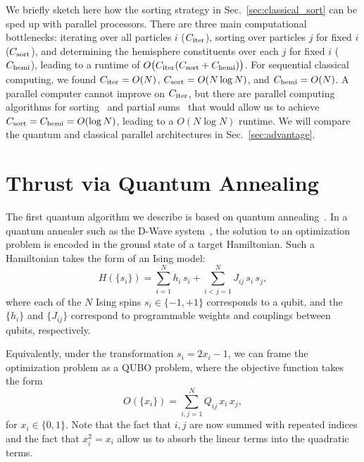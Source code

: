 \documentclass[aps,prd,twocolumn,superscriptaddress,preprintnumbers,nofootinbib,longbibliography,floatfix]{revtex4-1}
\DeclareRobustCommand{\Sec}[1]{Sec.~\ref{#1}}
\begin{document}
We briefly sketch here how  the sorting strategy in \Sec{sec:classical_sort} can be
sped up with parallel processors.
%
There are three main computational bottlenecks:  iterating over all particles $i$ ($C_{\rm iter}$), sorting over particles $j$ for fixed $i$ ($C_{\rm sort}$), and determining the hemisphere constituents over each $j$ for fixed $i$ ($C_{\rm hemi}$), leading to a runtime of $O\big(C_{\rm iter} (C_{\rm sort} + C_{\rm hemi}) \big)$.
%
For sequential classical computing, we found $C_{\rm iter} = O(N)$, $C_{\rm sort} = O(N \log N)$, and $C_{\rm hemi} = O(N)$.
%
A parallel computer cannot improve on $C_{\rm iter}$, but there are parallel computing algorithms for sorting~\cite{powers91} and partial sums~\cite{ladner80} that would allow us to achieve $C_{\rm sort} = C_{\rm hemi} = O(\log N)$, leading to a $O(N \log N)$ runtime.
%
We will compare the quantum and classical parallel architectures in \Sec{sec:advantage}.

%
%

\section{Thrust via Quantum Annealing}
\label{sec:qubo}


The first quantum algorithm we describe is based on quantum annealing~\cite{PhysRevE.58.5355, 2000quant.ph..1106F}.
%
In a quantum annealer such as the D-Wave system~\cite{dwave}, the solution to an optimization problem is encoded in the ground state of a target Hamiltonian.
%
Such a Hamiltonian takes the form of an Ising model:
%
\begin{equation}
H(\{s_i\})=\sum_{i=1}^N h_i \, s_i + \sum_{i<j=1}^N J_{ij} \, s_i \, s_j,
\end{equation}
%
where each of the $N$ Ising spins $s_i\in\{-1, +1\}$ corresponds to a qubit, and the $\{h_i\}$ and $\{J_{ij}\}$ correspond to programmable weights and couplings between qubits, respectively.


Equivalently, under the transformation $s_i=2x_i-1$, we can frame the optimization problem as a \ac{QUBO} problem, where the objective function takes the form
%
\begin{equation}
\label{eq:qubo}
O(\{x_i\})=\sum_{i,j=1}^NQ_{ij} \, x_i \, x_j, 
\end{equation}
%
for $x_i\in\{0,1\}$.
%
Note that the fact that $i, j$ are now summed with repeated indices and the fact that $x_i^2=x_i$ allow us to absorb the linear terms into the quadratic terms.
\end{document}
